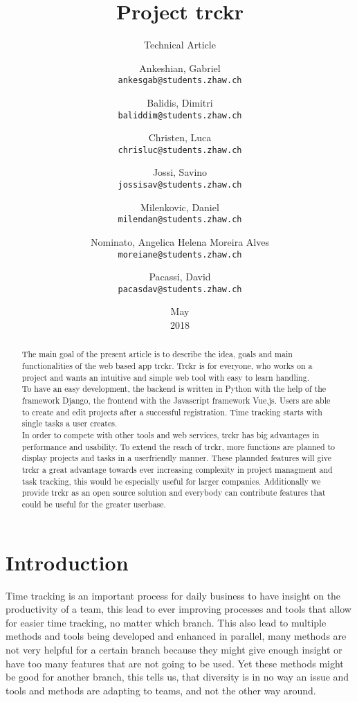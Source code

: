 \documentclass[a4paper, 12pt, headsepline]{scrartcl}
\title{Project trckr}
\subtitle{Technical Article}
\date{May \\ 2018}
\author{
Ankeshian, Gabriel\\
\texttt{ankesgab@students.zhaw.ch}
\and
Balidis, Dimitri\\
\texttt{baliddim@students.zhaw.ch}
\and
Christen, Luca\\
\texttt{chrisluc@students.zhaw.ch}
\and
Jossi, Savino\\
\texttt{jossisav@students.zhaw.ch}
\and
Milenkovic, Daniel\\
\texttt{milendan@students.zhaw.ch}
\and
Nominato, Angelica Helena Moreira Alves\\
\texttt{moreiane@students.zhaw.ch}
\and
Pacassi, David\\
\texttt{pacasdav@students.zhaw.ch}}
\begin{document}
\maketitle
\pagebreak

\begin{abstract}
The main goal of the present article is to describe the idea, goals and main functionalities of the web based app trckr. Trckr is for everyone,
who works on a project and wants an intuitive and simple web tool with easy to learn handling.\\
To have an easy development, the backend is written in Python with the help of the framework Django, the frontend with the Javascript
framework Vue.js. Users are able to create and edit projects after a successful registration. Time tracking starts with single tasks
a user creates.\\
In order to compete with other tools and web services, trckr has big advantages in performance and usability. To extend the reach of trckr, more
functions are planned to display projects and tasks in a userfriendly manner. These plannded features will give trckr a great advantage towards ever 
increasing complexity in project managment and task tracking, this would be especially useful for larger companies. Additionally we provide trckr
as an open source solution and everybody can contribute features that could be useful for the greater userbase.

\end{abstract}

\pagebreak


\tableofcontents

\pagebreak

\section{Introduction}
Time tracking is an important process for daily business to have insight on the productivity of a team, this lead to ever improving processes and tools
that allow for easier time tracking, no matter which branch. This also lead to multiple methods and tools being developed and enhanced in parallel,
many methods are not very helpful for a certain branch because they might give enough insight or have too many features that are not going to be used.
Yet these methods might be good for another branch, this tells us, that diversity is in no way an issue and tools and methods are adapting to teams,
and not the other way around.
\end{document}
